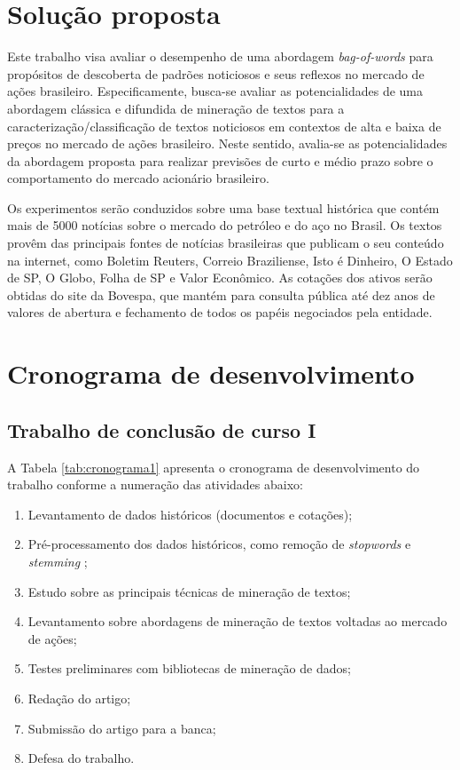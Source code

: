 \documentclass[11pt,a4paper]{article}
\begin{document}
\section{Solução proposta}

Este trabalho visa avaliar o desempenho de uma abordagem \textit{bag-of-words} \cite{Manning:IR} para propósitos de descoberta de padrões noticiosos e seus reflexos no mercado de ações brasileiro. Especificamente, busca-se avaliar as potencialidades de uma abordagem clássica e difundida de mineração de textos para a caracterização/classificação de textos noticiosos em contextos de alta e baixa de preços no mercado de ações brasileiro. Neste sentido, avalia-se as potencialidades da abordagem proposta para realizar previsões de curto e médio prazo sobre o comportamento do mercado acionário brasileiro. 

Os experimentos serão conduzidos sobre uma base textual histórica que contém mais de 5000 notícias sobre o mercado do petróleo e do aço no Brasil. Os textos provêm das principais fontes de notícias brasileiras que publicam o seu conteúdo na internet, como Boletim Reuters, Correio Braziliense, Isto é Dinheiro, O Estado de SP, O Globo, Folha de SP e Valor Econômico. As cotações dos ativos serão obtidas do site da Bovespa, que mantém para consulta pública até dez anos de valores de abertura e fechamento de todos os papéis negociados pela entidade.


\section{Cronograma de desenvolvimento}\label{sec:cronograma}

\subsection{Trabalho de conclusão de curso I}

A Tabela \ref{tab:cronograma1} apresenta o cronograma de desenvolvimento do trabalho conforme a numeração das atividades abaixo:
\begin{enumerate}
	\item Levantamento de dados históricos (documentos e cotações);
	\item Pré-processamento dos dados históricos, como remoção de \textit{stopwords} e \textit{stemming} \cite{Weiss:textMining,orengo_stemming};
	\item Estudo sobre as principais técnicas de mineração de textos;  
	\item Levantamento sobre abordagens de mineração de textos voltadas ao mercado de ações;
	\item Testes preliminares com bibliotecas de mineração de dados;
	\item Redação do artigo;
	\item Submissão do artigo para a banca;
	\item Defesa do trabalho.
\end{enumerate}
\end{document}
